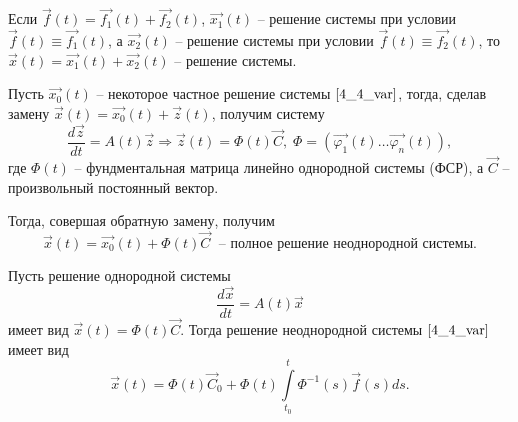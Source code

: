 \begin{lemma}
    Если $\overrightarrow{f}(t) = \overrightarrow{f_1}(t) + \overrightarrow{f_2}(t)$, $\overrightarrow{x_1}(t)$ -- решение системы при условии $\overrightarrow{f}(t) \equiv \overrightarrow{f_1}(t)$, а $\overrightarrow{x_2}(t)$ -- решение системы при условии $\overrightarrow{f}(t) \equiv \overrightarrow{f_2}(t)$, то $\overrightarrow{x}(t) = \overrightarrow{x_1}(t) + \overrightarrow{x_2}(t)$ -- решение системы.
\end{lemma}

\begin{proposition}
    Пусть $\overrightarrow{x_0}(t)$ -- некоторое частное решение системы $\eqref{4_4_var}$, тогда, сделав замену $\overrightarrow{x}(t) = \overrightarrow{x_0}(t) + \overrightarrow{z}(t)$, получим систему
    \begin{equation*}
        \frac{d \overrightarrow z}{dt} = A(t) \overrightarrow z \Rightarrow \overrightarrow z(t) = \varPhi(t) \overrightarrow C, \; \varPhi = \left( \overrightarrow{\varphi_1}(t) \dots \overrightarrow{\varphi_n}(t)\right),
    \end{equation*}
    где $\varPhi(t)$ -- фундментальная матрица линейно однородной системы (ФСР), а $\overrightarrow C$ -- произвольный постоянный вектор.

    Тогда, совершая обратную замену, получим
    \begin{equation*}
        \overrightarrow{x}(t) = \overrightarrow{x_0}(t) + \varPhi(t) \overrightarrow C \; \text{ -- полное решение неоднородной системы.}
    \end{equation*}
\end{proposition}

\begin{theorem}
    Пусть решение однородной системы
    \begin{equation*}
        \frac{d \overrightarrow x}{dt} = A(t) \overrightarrow x
    \end{equation*}
    имеет вид $\overrightarrow{x}(t) = \varPhi(t) \overrightarrow C$. Тогда решение неоднородной системы $\eqref{4_4_var}$ имеет вид
    \begin{equation*}
        \overrightarrow x(t) = \varPhi(t) \overrightarrow C_0 + \varPhi(t) \int \limits_{t_0}^t \varPhi^{-1}(s) \overrightarrow{f}(s) ds.
    \end{equation*}
\end{theorem}

